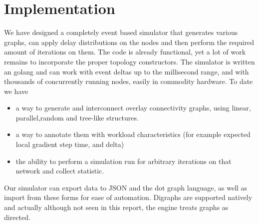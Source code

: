 \documentclass[12pt,notitlepage]{article}
\begin{document}
\section{Implementation}
We have designed a completely event based simulator that generates various graphs, 
can apply delay distributions on the nodes and then perform the required amount
of iterations on them. The code is already functional, yet a lot of work remains
to incorporate the proper topology constructors. The simulator is written an golang
and can work with event deltas up to the millisecond range, and with thousands of
concurrently running nodes, easily in commodity hardware. To date we have
\begin{itemize}
	\item a way to generate and interconnect overlay connectivity graphs, using linear,
		parallel,random and tree-like structures.
	\item a way to annotate them with workload characteristics (for example expected
		local gradient step time, and delta)
	\item the ability to perform a simulation run for arbitrary iterations on that
		network and collect statistic.
\end{itemize}
Our simulator can export data to JSON and the dot graph language, as well as import from these forms for ease
of automation. Digraphs are supported natively and actually although not seen in this report, 
the engine treats graphs as directed.
\end{document}
